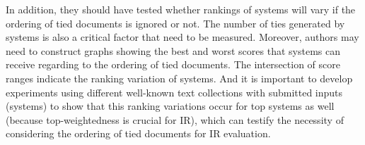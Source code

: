 \documentclass{article}
\begin{document}
In addition, they should have tested whether rankings of systems will vary if the ordering of tied documents is ignored or not. The number of ties generated by systems is also a critical factor that need to be measured. Moreover, authors may need to construct graphs showing the best and worst scores that systems can receive regarding to the ordering of tied documents. The intersection of score ranges indicate the ranking variation of systems. And it is important to develop experiments using different well-known text collections with submitted inputs (systems) to show that this ranking variations occur for top systems as well (because top-weightedness is crucial for IR), which can testify the necessity of considering the ordering of tied documents for IR evaluation. 


%
\end{document}
